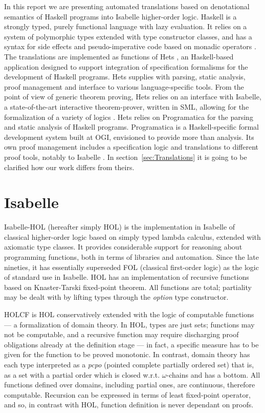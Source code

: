 \documentclass[a4paper,12pt]{article}
\begin{document}
In this report we are presenting automated translations based on
denotational semantics of Haskell programs into Isabelle higher-order
logic. Haskell is a strongly typed, purely functional language with
lazy evaluation. It relies on a system of polymorphic types extended
with type constructor classes, and has a syntax for side effects and
pseudo-imperative code based on monadic operators \cite{HaskellRep}.
The translations are implemented as functions of Hets \cite{Hets}, an
Haskell-based application designed to support integration of
specification formalisms for the development of Haskell programs. Hets
supplies with parsing, static analysis, proof management and interface
to various language-specific tools.  From the point of view of generic
theorem proving, Hets relies on an interface with Isabelle, a
state-of-the-art interactive theorem-prover, written in SML, allowing
for the formalization of a variety of logics \cite{Paulson94isa}. Hets
relies on Programatica \cite{Prog04} for the parsing and static
analysis of Haskell programs. Programatica is a Haskell-specific
formal development system built at OGI, envisioned to provide more
than analysis. Its own proof management includes a specification logic
and translations to different proof tools, notably to Isabelle
\cite{Huff}. In section~\ref{sec:Translations} it is going to be
clarified how our work differs from theirs.


\section{Isabelle}

Isabelle-HOL (hereafter simply HOL) is the implementation in Isabelle
of classical higher-order logic based on simply typed lambda calculus,
extended with axiomatic type classes. It provides considerable support
for reasoning about programming functions, both in terms of libraries
and automation. Since the late nineties, it has essentially superseded
FOL (classical first-order logic) as the logic of standard use in
Isabelle. HOL has an implementation of recursive functions based on
Knaster-Tarski fixed-point theorem. All functions are total;
partiality may be dealt with by lifting types through the
\emph{option} type constructor.

HOLCF \cite{holcf} is HOL conservatively extended with the logic of
computable functions --- a formalization of domain theory. In HOL,
types are just sets; functions may not be computable, and a recursive
function may require discharging proof obligations already at the
definition stage --- in fact, a specific measure has to be given for
the function to be proved monotonic.  In contrast, domain theory has
each type interpreted as a \emph{pcpo} (pointed complete partially
ordered set) that is, as a set with a partial order which is closed
w.r.t.  $\omega$-chains and has a bottom. All functions defined over
domains, including partial ones, are continuous, therefore computable.
Recursion can be expressed in terms of least fixed-point operator, and
so, in contrast with HOL, function definition is never dependant on
proofs.
\end{document}
